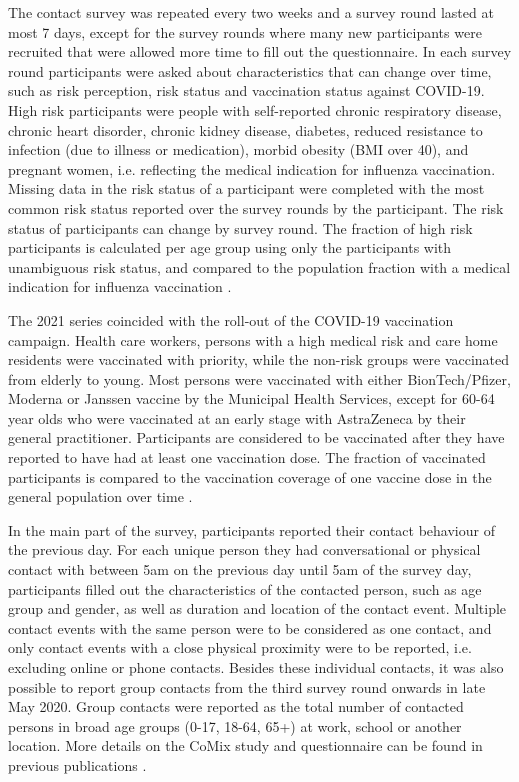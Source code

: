\documentclass[fleqn,10pt]{wlscirep}
\begin{document}
The contact survey was repeated every two weeks and a survey round lasted at most 7 days, except for the survey rounds where many new participants were recruited that were allowed more time to fill out the questionnaire. In each survey round participants were asked about characteristics that can change over time, such as risk perception, risk status and vaccination status against COVID-19. High risk participants were people with self-reported chronic respiratory disease, chronic heart disorder, chronic kidney disease, diabetes, reduced resistance to infection (due to illness or medication), morbid obesity (BMI over 40), and pregnant women, i.e. reflecting the medical indication for influenza vaccination. Missing data in the risk status of a participant were completed with the most common risk status reported over the survey rounds by the participant. The risk status of participants can change by survey round. The fraction of high risk participants is calculated per age group using only the participants with unambiguous risk status, and compared to the population fraction with a medical indication for influenza vaccination \cite{Nivel_2021}. 

The 2021 series coincided with the roll-out of the COVID-19 vaccination campaign. Health care workers, persons with a high medical risk and care home residents were vaccinated with priority, while the non-risk groups were vaccinated from elderly to young. Most persons were vaccinated with either BionTech/Pfizer, Moderna or Janssen vaccine by the Municipal Health Services, except for 60-64 year olds who were vaccinated at an early stage with AstraZeneca by their general practitioner. Participants are considered to be vaccinated after they have reported to have had at least one vaccination dose. The fraction of vaccinated participants is compared to the vaccination coverage of one vaccine dose in the general population over time \cite{RIVM_2022}. 

In the main part of the survey, participants reported their contact behaviour of the previous day. For each unique person they had conversational or physical contact with between 5am on the previous day until 5am of the survey day, participants filled out the characteristics of the contacted person, such as age group and gender, as well as duration and location of the contact event. Multiple contact events with the same person were to be considered as one contact, and only contact events with a close physical proximity were to be reported, i.e. excluding online or phone contacts. Besides these individual contacts, it was also possible to report group contacts from the third survey round onwards in late May 2020. Group contacts were reported as the total number of contacted persons in broad age groups (0-17, 18-64, 65+) at work, school or another location. More details on the CoMix study and questionnaire can be found in previous publications \cite{Jarvis_2020, Verelst_2021, Gimma_2022}.
\end{document}
